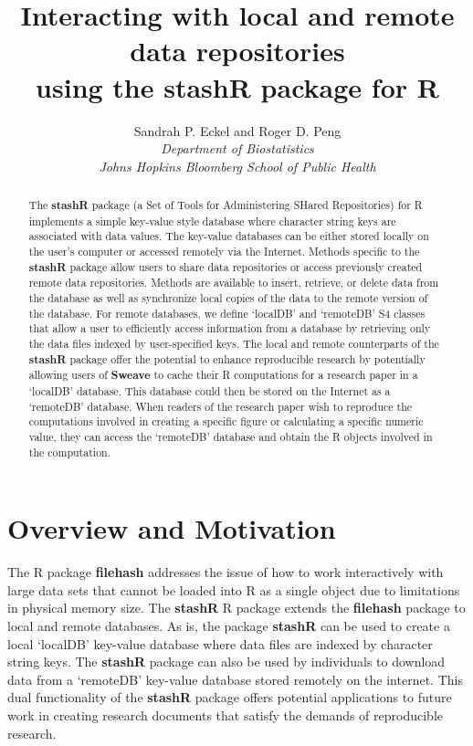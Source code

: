 \documentclass{article}
\title{Interacting with local and remote data repositories\\ 
using the \textbf{stashR} package for R}
\author{Sandrah P. Eckel and Roger D. Peng \\
\textit{Department of
Biostatistics}\\\textit{Johns Hopkins Bloomberg School of Public Health}}
\date{}
\newcommand{\pkg}{\textbf}
\begin{document}
\maketitle

\begin{abstract}
The \pkg{stashR} package (a Set of Tools for Administering SHared
Repositories) for R implements a simple key-value style database where
character string keys are associated with data values. The key-value
databases can be either stored locally on the user's computer or
accessed remotely via the Internet.  Methods specific to the \pkg{stashR}
package allow users to share data repositories or access previously
created remote data repositories.  Methods are available to insert,
retrieve, or delete data from the database as well as synchronize
local copies of the data to the remote version of the database. For
remote databases, we define `localDB' and `remoteDB' S4 classes that
allow a user to efficiently access information from a database by
retrieving only the data files indexed by user-specified keys. The
local and remote counterparts of the \pkg{stashR} package offer the potential to
enhance reproducible research by potentially allowing users of
\pkg{Sweave} to cache their R computations for a research paper in a
`localDB' database.  This database could then be stored on the
Internet as a `remoteDB' database. When readers of the research paper
wish to reproduce the computations involved in creating a specific
figure or calculating a specific numeric value, they can access the
`remoteDB' database and obtain the R objects involved in the
computation.


\end{abstract}


\section{Overview and Motivation}

The R package \pkg{filehash} addresses the issue of how to work interactively 
with large data sets that cannot be loaded into R as a single object due to 
limitations in physical memory size. The \pkg{stashR} R package extends the 
\pkg{filehash} package to local and remote databases. As is, the package 
\pkg{stashR} can be used to create a local `localDB'
key-value database where data files are indexed by character string keys. The
\pkg{stashR} package can also be used by individuals to download
data from a `remoteDB' key-value database stored remotely on the 
internet. This dual functionality of the \pkg{stashR} package
offers potential applications to future work in creating research documents
that satisfy the demands of reproducible research.
\end{document}
